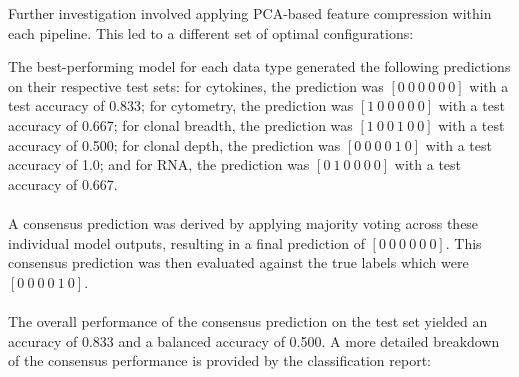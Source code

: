 \documentclass[12pt,a4paper]{report}
\begin{document}
\noindent
Further investigation involved applying PCA-based feature compression within each pipeline. This led to a different set of optimal configurations:
\begin{table}[H]
    \centering
    \hspace*{-1cm}
    \caption[Optimal Modeling Configurations Compressed Features]{Optimal Modeling Configurations for Compressed Features}
    \label{tab:optimal_configs_compressed}
\end{table}
\noindent
The best-performing model for each data type generated the following predictions on their respective test sets: for cytokines, the prediction was $[0\ 0\ 0\ 0\ 0\ 0]$ with a test accuracy of 0.833; for cytometry, the prediction was $[1\ 0\ 0\ 0\ 0\ 0]$ with a test accuracy of 0.667; for clonal breadth, the prediction was $[1\ 0\ 0\ 1\ 0\ 0]$ with a test accuracy of 0.500; for clonal depth, the prediction was $[0\ 0\ 0\ 0\ 1\ 0]$ with a test accuracy of 1.0; and for RNA, the prediction was $[0\ 1\ 0\ 0\ 0\ 0]$ with a test accuracy of 0.667.\\
\\
A consensus prediction was derived by applying majority voting across these individual model outputs, resulting in a final prediction of $[0\ 0\ 0\ 0\ 0\ 0]$. This consensus prediction was then evaluated against the true labels which were $[0\ 0\ 0\ 0\ 1\ 0]$.\\
\\
The overall performance of the consensus prediction on the test set yielded an accuracy of 0.833 and a balanced accuracy of 0.500. A more detailed breakdown of the consensus performance is provided by the classification report:
\end{document}
